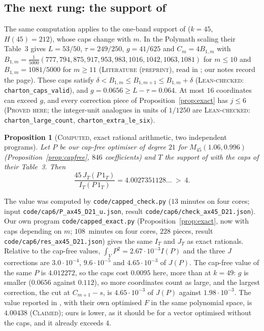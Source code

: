 \documentclass[11pt]{amsart}
\newtheorem{proposition}[theorem]{Proposition}
\theoremstyle{definition}
\theoremstyle{remark}
\newcommand{\lbl}[1]{\textup{\textsc{#1}}}
\begin{document}
\subsection*{The next rung: the support of \texorpdfstring{\cite{Cha26}}{Charton et al.}}
The same computation applies to the one-band support of \cite{Cha26}
($k=45$, $H(45)=212$), whose caps change with $m$. In the Polymath scaling
their Table~3 gives $L=53/50$, $\tau=249/250$, $g=41/625$ and
$C_m=4B_{1,m}$ with
$B_{1,m}=\frac{1}{5000}(777,794,875,917,953,983,1016,1042,1063,1081)$ for
$m\le10$ and $B_{1,m}=1081/5000$ for $m\ge11$ (\lbl{Literature (preprint)},
read in \cite{Cha26}; our notes record the page). These caps satisfy
$\delta<B_{1,m}\le B_{1,m+1}\le B_{1,m}+\delta$ (\lbl{Lean-checked}:
\texttt{charton\_caps\_valid}), and $g=0.0656\ge L-\tau=0.064$. At most $16$
coordinates can exceed $g$, and every correction piece of
Proposition~\ref{prop:exact} has $j\le6$ (\lbl{Proved here}; the integer-unit
analogues in units of $1/1250$ are \lbl{Lean-checked}:
\texttt{charton\_large\_count}, \texttt{charton\_extra\_le\_six}).

\begin{proposition}[\lbl{Computed}, exact rational arithmetic, two independent programs]\label{prop:cha-capped}
Let $P$ be our cap-free optimiser of degree $21$ for
$M_{45}(1.06,0.996)$ (Proposition~\ref{prop:capfree}, $846$ coefficients) and
$T$ the support of \cite{Cha26} with the caps of their Table~3. Then
\[
\frac{45\,J_T(P\,1_T)}{I_T(P\,1_T)}=4.0027351128\ldots\ >\ 4 .
\]
\end{proposition}

\begin{sloppypar}
The value was computed by \texttt{code/capped\_check.py} ($13$ minutes on four
cores; input \texttt{code/cap6/P\_ax45\_D21\_u.json}, result
\texttt{code/cap6/check\_ax45\_D21.json}). Our own program \texttt{code/capped\_exact.py}
(Proposition~\ref{prop:exact}, now with caps depending on $m$; $108$~minutes
on four cores, $228$ pieces, result \texttt{code/cap6/res\_ax45\_D21.json})
gives the same $I_T$ and $J_T$ as exact rationals. Relative to the cap-free
values, $\int_VP^2=2.67\cdot10^{-3}I(P)$ and the three $J$ corrections are
$3.0\cdot10^{-4}$, $9.6\cdot10^{-5}$ and $4.65\cdot10^{-3}$ of $J(P)$. The cap-free value of the
same $P$ is $4.012272$, so the caps cost $0.0095$ here, more than at $k=49$:
$g$ is smaller ($0.0656$ against $0.112$), so more coordinates count as
large, and the largest correction, the cut at $C_{m+1}-s$, is $4.65\cdot10^{-3}$
of $J(P)$ against $1.98\cdot10^{-3}$. The value reported in \cite[Thm.~11.1]{Cha26}, with their own
optimised $F$ in the same polynomial space, is $4.00438$ (\lbl{Claimed});
ours is lower, as it should be for a vector optimised without the caps, and
it already exceeds $4$.
\end{sloppypar}
\end{document}
